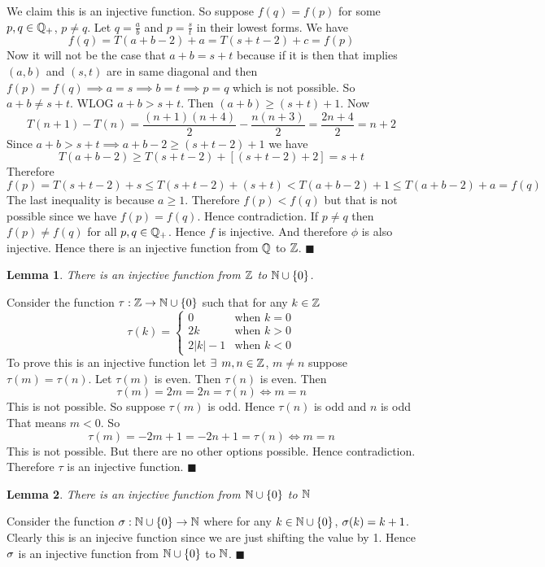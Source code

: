 \documentclass[a4paper, 11pt]{article}
\newtheorem{lemma}{Lemma}
\renewenvironment{proof}{\noindent{\it \textbf{Proof:}}\hspace*{1em}}{\hfill $\blacksquare$\bigskip\\}
\begin{document}
{\begin{itemize}
\begin{proof}
 We claim this is an injective function. So suppose $f(q)=f(p)$ for some $p,q\in\mathbb{Q}_+$, $ p\neq q$. Let $q=\frac{a}{b}$ and $p=\frac{s}{t}$ in their lowest forms. We have $$f(q)=T(a+b-2)+a=T(s+t-2)+c=f(p)$$Now it will not be the case that $a+b=s+t$ because if it is then that implies $(a,b)$ and $(s,t)$ are in same diagonal and then $f(p)=f(q)\implies a=s\implies b=t\implies p=q$ which is not possible. So $a+b\neq s+t$. WLOG $a+b>s+t$. Then $(a+b)\geq (s+t)+1$. Now $$T(n+1)-T(n)=\frac{(n+1)(n+4)}2-\frac{n(n+3)}2=\frac{2n+4}2=n+2$$ Since $a+b>s+t\implies a+b-2\geq (s+t-2)+1$ we have $$T(a+b-2)\geq T(s+t-2)+[(s+t-2)+2]=s+t$$Therefore $$f(p)=T(s+t-2)+s\leq T(s+t-2)+(s+t)<T(a+b-2)+1\leq T(a+b-2)+a=f(q)$$The last inequality is because $a\geq 1$. Therefore $f(p)<f(q)$ but that is not possible since we have $f(p)=f(q)$. Hence contradiction. If $p\neq q $ then $f(p)\neq f(q)$ for all $p,q\in\mathbb{Q}_+$. Hence $f$ is injective. And therefore $\phi$ is also injective. Hence there is an injective function from $\mathbb{Q}$ to $\mathbb{Z}$.
\end{proof}
\begin{lemma}\label{ztoninj}
	There is an injective function from $\mathbb{Z}$ to $\mathbb{N}\cup \{0\}$. 
\end{lemma}
\begin{proof}
	Consider the function $\tau:\mathbb{Z}\to \mathbb{N}\cup\{0\}$ such that for any $k\in\mathbb{Z}$ $$\tau(k)=\begin{cases}
		0&\text{when $k=0$}\\
		2k & \text{when $k>0$}\\
		2|k|-1 & \text{when $k<0$}
	\end{cases}$$To prove this is an injective function let $\exists$ $m,n\in \mathbb{Z}$, $m\neq n$ suppose $\tau(m)=\tau(n)$. Let $\tau(m)$ is even. Then $\tau(n)$ is even. Then $$\tau(m)=2m=2n=\tau(n)\iff m=n$$ This is not possible. So suppose $\tau(m)$ is odd. Hence $\tau(n)$ is odd and $n$ is odd That means $m<0$. So $$\tau(m)=-2m+1=-2n+1=\tau(n)\iff m=n$$This is not possible. But there are no other options possible. Hence contradiction. Therefore $\tau$ is an injective function.
\end{proof}
\begin{lemma}\label{n0toninj}
	There is an injective function from $\mathbb{N}\cup\{0\}$ to $\mathbb{N}$
\end{lemma}
\begin{proof}
	Consider the function $\sigma:\mathbb{N}\cup\{0\}\to \mathbb{N}$ where for any $k\in \mathbb{N}\cup \{0\}$, $\sigma(k)=k+1$. Clearly this is an injecive function since we are just shifting the value by 1. Hence $\sigma$ is an injective function from $\mathbb{N}\cup\{0\}$ to $\mathbb{N}$. 
\end{proof}


\end{itemize}}
\end{document}
